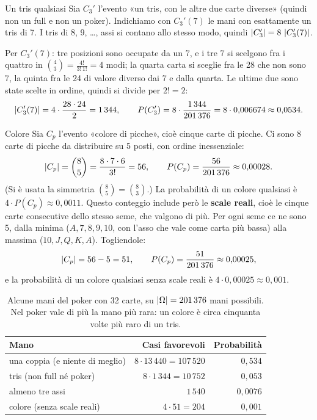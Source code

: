 \begin{esempio}{Un tris qualsiasi}
Sia $C_3'$ l'evento «un tris, con le altre due carte diverse» (quindi non un full e non un poker). Indichiamo con
$C_3'(7)$ le mani con esattamente un tris di 7. I tris di 8, 9, \ldots, assi si contano allo stesso modo, quindi
$\left\lvert C_3' \right\rvert = 8\,\left\lvert C_3'(7) \right\rvert$.

Per $C_3'(7)$: tre posizioni sono occupate da un 7, e i tre 7 si scelgono fra i quattro in $\binom{4}{3} =
\frac{4!}{3!\,1!} = 4$ modi; la quarta carta si sceglie fra le 28 che non sono 7, la quinta fra le 24 di valore
diverso dai 7 e dalla quarta. Le ultime due sono state scelte in ordine, quindi si divide per $2! = 2$:
\[
  \left\lvert C_3'(7) \right\rvert = 4 \cdot \frac{28 \cdot 24}{2} = 1\,344 ,
  \qquad
  P(C_3') = 8 \cdot \frac{1\,344}{201\,376} = 8 \cdot 0{,}006674 \approx 0{,}0534 .
\]
\end{esempio}

\begin{esempio}{Colore}
Sia $C_p$ l'evento «colore di picche», cioè cinque carte di picche. Ci sono 8 carte di picche da distribuire su 5
posti, con ordine inessenziale:
\[
  \left\lvert C_p \right\rvert = \binom{8}{5} = \frac{8 \cdot 7 \cdot 6}{3!} = 56 ,
  \qquad
  P(C_p) = \frac{56}{201\,376} \approx 0{,}00028 .
\]
(Si è usata la simmetria $\binom{8}{5} = \binom{8}{3}$.) La probabilità di un colore qualsiasi è $4 \cdot P(C_p)
\approx 0{,}0011$. Questo conteggio include però le \textbf{scale reali}, cioè le cinque carte consecutive dello stesso
seme, che valgono di più. Per ogni seme ce ne sono 5, dalla minima ($A, 7, 8, 9, 10$, con l'asso che vale come carta
più bassa) alla massima ($10, J, Q, K, A$). Togliendole:
\[
  \left\lvert C_p \right\rvert = 56 - 5 = 51 ,
  \qquad
  P(C_p) = \frac{51}{201\,376} \approx 0{,}00025 ,
\]
e la probabilità di un colore qualsiasi senza scale reali è $4 \cdot 0{,}00025 \approx 0{,}001$.
\end{esempio}

\begin{table}[H]
\centering
\renewcommand{\arraystretch}{1.25}
\begin{tabular}{@{}lrr@{}}
  \toprule
  \textbf{Mano} & \textbf{Casi favorevoli} & \textbf{Probabilità} \\
  \midrule
  una coppia (e niente di meglio) & $8 \cdot 13\,440 = 107\,520$ & $0{,}534$ \\
  tris (non full né poker) & $8 \cdot 1\,344 = 10\,752$ & $0{,}053$ \\
  almeno tre assi & $1\,540$ & $0{,}0076$ \\
  colore (senza scale reali) & $4 \cdot 51 = 204$ & $0{,}001$ \\
  \bottomrule
\end{tabular}
\caption{Alcune mani del poker con 32 carte, su $\left\lvert \Omega \right\rvert = 201\,376$ mani possibili. Nel poker vale di più la
mano più rara: un colore è circa cinquanta volte più raro di un tris.}
\end{table}

